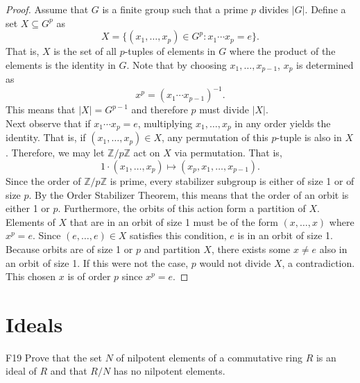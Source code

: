 \documentclass{article}
\newcommand{\Z}{\mathbb{Z}}
\newcommand{\inv}{^{-1}}
\newcommand{\sq}{\subseteq}
\theoremstyle{definition}
\begin{document}
	\begin{proof}
	Assume that $G$ is a finite group such that a prime $p$ divides $|G|$. Define a set $X \sq G^p$ as
		\[X = \{(x_1, \ldots, x_p) \in G^p: x_1 \cdots x_p = e\}. \]
	That is, $X$ is the set of all $p$-tuples of elements in $G$ where the product of the elements is the identity in $G$. Note that by choosing $x_1, \ldots, x_{p-1}$, $x_p$ is determined as
		\[x^p = (x_1 \cdots x_{p - 1})\inv. \]
	This means that $|X| = G^{p-1}$ and therefore $p$ must divide $|X|$.\\
	
	Next observe that if $x_1 \cdots x_p = e$, multiplying $x_1, \ldots, x_p$ in any order yields the identity. That is, if $(x_1, \ldots, x_p) \in X$, any permutation of this $p$-tuple is also in $X$. Therefore, we may let $\Z / p\Z$ act on $X$ via permutation. That is,
		\[1 \cdot (x_1, \ldots, x_p) \mapsto (x_p, x_1, \ldots, x_{p-1}). \]
	Since the order of $\Z / p\Z$ is prime, every stabilizer subgroup is either of size 1 or of size $p$. By the Order Stabilizer Theorem, this means that the order of an orbit is either 1 or $p$. Furthermore, the orbits of this action form a partition of $X$. Elements of $X$ that are in an orbit of size 1 must be of the form $(x, \ldots, x)$ where $x^p = e$. Since $(e, \ldots, e) \in X$ satisfies this condition, $e$ is in an orbit of size 1. Because orbits are of size 1 or $p$ and partition $X$, there exists some $x \neq e$ also in an orbit of size 1. If this were not the case, $p$ would not divide $X$, a contradiction. This chosen $x$ is of order $p$ since $x^p = e$.
	\end{proof}
	

\section{Ideals}

	\begin{prob}{F19}{}
	Prove that the set $N$ of nilpotent elements of a commutative ring $R$ is an ideal of $R$ and that $R/N$ has no nilpotent elements.
	\end{prob}
	
\end{document}
